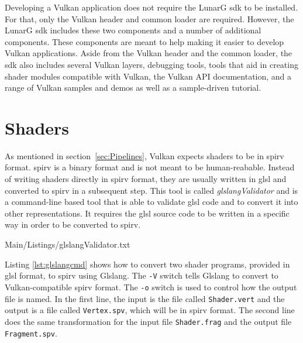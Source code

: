     Developing a Vulkan application does not require the LunarG \gls{sdk} to be installed.
    For that, only the Vulkan header and common loader are required.
    However, the LunarG \gls{sdk} includes these two components and a number of additional components.
    These components are meant to help making it easier to develop Vulkan applications.
    Aside from the Vulkan header and the common loader, the \gls{sdk} also includes several Vulkan layers, debugging tools, tools that aid in creating shader modules compatible with Vulkan, the Vulkan API documentation, and a range of Vulkan samples and demos as well as a sample-driven tutorial.



  \section{Shaders}
  \label{sec:EnvShaders}
    As mentioned in section~\ref{sec:Pipelines}, Vulkan expects shaders to be in \gls{spirv} format.
    \gls{spirv} is a binary format and is not meant to be human-reabable.
    Instead of writing shaders directly in \gls{spirv} format, they are usually written in \gls{glsl} and converted to \gls{spirv} in a subsequent step.
    This tool is called \textit{glslangValidator}\cite{glslangrepo} and is a command-line based tool that is able to validate \gls{glsl} code and to convert it into other representations.
    It requires the \gls{glsl} source code to be written in a specific way in order to be converted to \gls{spirv}.


    
    {Main/Listings/glslangValidator.txt}

    Listing \ref{lst:glslangcmd} shows how to convert two shader programs, provided in \gls{glsl} format, to \gls{spirv} using Glslang.
    The \lstinline{-V} switch tells Glslang to convert to Vulkan-compatible \gls{spirv} format.
    The \lstinline{-o} switch is used to control how the output file is named.
    In the first line, the input is the file called \lstinline{Shader.vert} and the output is a file called \lstinline{Vertex.spv}, which will be in \gls{spirv} format.
    The second line does the same transformation for the input file \lstinline{Shader.frag} and the output file \lstinline{Fragment.spv}.

